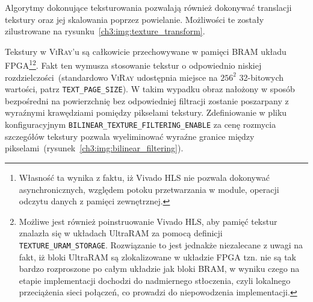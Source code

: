 \begin{enumerate}
\begin{itemize}
\end{itemize}

Algorytmy dokonujące teksturowania pozwalają również dokonywać translacji tekstury oraz jej skalowania poprzez powielanie. Możliwości te zostały zilustrowane na rysunku~\ref{ch3:img:texture_transform}.


Tekstury w \textsc{ViRay}'u są całkowicie przechowywane w pamięci BRAM układu FPGA\footnote{Własność ta wynika z faktu, iż Vivado HLS nie pozwala dokonywać asynchronicznych, względem potoku przetwarzania w module, operacji odczytu danych z pamięci zewnętrznej.}\footnote{Możliwe jest również poinstruowanie Vivado HLS, aby pamięć tekstur znalazła się w układach UltraRAM za pomocą definicji \texttt{TEXTURE\_URAM\_STORAGE}. Rozwiązanie to jest jednakże niezalecane z uwagi na fakt, iż bloki UltraRAM są zlokalizowane w układzie FPGA tzn. nie są tak bardzo rozproszone po całym układzie jak bloki BRAM, w wyniku czego na etapie implementacji dochodzi do nadmiernego stłoczenia, czyli lokalnego przeciążenia sieci połączeń, co prowadzi do niepowodzenia implementacji.}. Fakt ten wymusza stosowanie tekstur o odpowiednio niskiej rozdzielczości~(standardowo \textsc{ViRay} udostępnia miejsce na $256^2$ 32-bitowych wartości, patrz \texttt{TEXT\_PAGE\_SIZE}). W takim wypadku obraz nałożony w sposób bezpośredni na powierzchnię bez odpowiedniej filtracji zostanie poszarpany z wyraźnymi krawędziami pomiędzy pikselami tekstury. Zdefiniowanie w pliku konfiguracyjnym \texttt{BILINEAR\_TEXTURE\_FILTERING\_ENABLE} za cenę rozmycia szczegółów tekstury pozwala wyeliminować wyraźne granice między pikselami~(rysunek~\ref{ch3:img:bilinear_filtering}). 



\end{enumerate}
